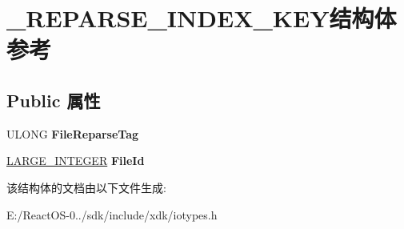 \hypertarget{struct___r_e_p_a_r_s_e___i_n_d_e_x___k_e_y}{}\section{\+\_\+\+R\+E\+P\+A\+R\+S\+E\+\_\+\+I\+N\+D\+E\+X\+\_\+\+K\+E\+Y结构体 参考}
\label{struct___r_e_p_a_r_s_e___i_n_d_e_x___k_e_y}
\subsection*{Public 属性}
\begin{DoxyCompactItemize}
\item 
\mbox{\label{struct___r_e_p_a_r_s_e___i_n_d_e_x___k_e_y_a10384a2af431ce9bbd83366d78483e6a}} 
U\+L\+O\+NG {\bfseries File\+Reparse\+Tag}
\item 
\mbox{\label{struct___r_e_p_a_r_s_e___i_n_d_e_x___k_e_y_a9ab1d499cdf8f43a0dba3f943351cacf}} 
\hyperlink{union___l_a_r_g_e___i_n_t_e_g_e_r}{L\+A\+R\+G\+E\+\_\+\+I\+N\+T\+E\+G\+ER} {\bfseries File\+Id}
\end{DoxyCompactItemize}


该结构体的文档由以下文件生成\+:\begin{DoxyCompactItemize}
\item 
E\+:/\+React\+O\+S-\/0../sdk/include/xdk/iotypes.\+h\end{DoxyCompactItemize}
